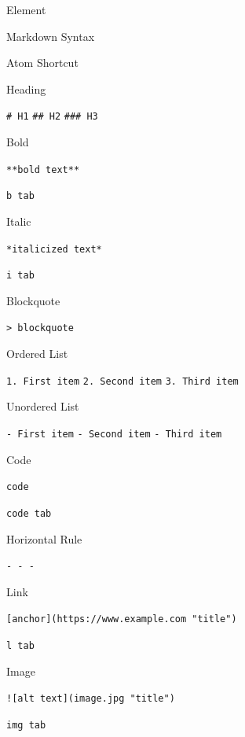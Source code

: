 \documentclass[]{book}
\theoremstyle{definition}
\theoremstyle{definition}
\theoremstyle{definition}
\theoremstyle{remark}
\begin{document}
Element

Markdown Syntax

Atom Shortcut

Heading

\texttt{\#\ H1} \texttt{\#\#\ H2} \texttt{\#\#\#\ H3}

Bold

\texttt{**bold\ text**}

\texttt{b\ tab}

Italic

\texttt{*italicized\ text*}

\texttt{i\ tab}

Blockquote

\texttt{\textgreater{}\ blockquote}

Ordered List

\texttt{1.\ First\ item} \texttt{2.\ Second\ item}
\texttt{3.\ Third\ item}

Unordered List

\texttt{-\ First\ item} \texttt{-\ Second\ item} \texttt{-\ Third\ item}

Code

\texttt{\textasciigrave{}code\textasciigrave{}}

\texttt{code\ tab}

Horizontal Rule

\texttt{-\ -\ -}

Link

\texttt{{[}anchor{]}(https://www.example.com\ "title")}

\texttt{l\ tab}

Image

\texttt{!{[}alt\ text{]}(image.jpg\ "title")}

\texttt{img\ tab}


\end{document}

